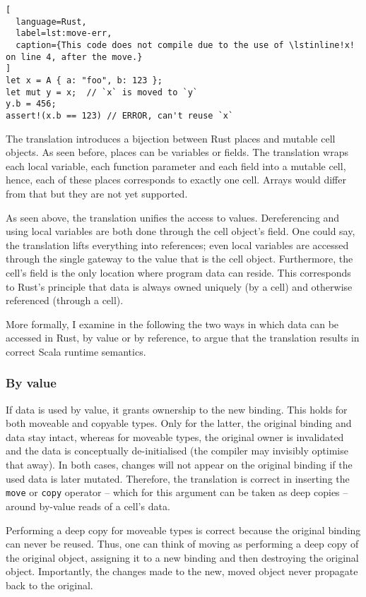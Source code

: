 \begin{lstlisting}[
  language=Rust,
  label=lst:move-err,
  caption={This code does not compile due to the use of \lstinline!x! on line 4, after the move.}
]
let x = A { a: "foo", b: 123 };
let mut y = x;  // `x` is moved to `y`
y.b = 456;
assert!(x.b == 123) // ERROR, can't reuse `x`
\end{lstlisting}

The translation introduces a bijection between Rust places and mutable cell
objects. As seen before, places can be variables or fields. The translation
wraps each local variable, each function parameter and each field into a mutable
cell, hence, each of these places corresponds to exactly one cell. Arrays would
differ from that but they are not yet supported.

As seen above, the translation unifies the access to values. Dereferencing and
using local variables are both done through the cell object's field. One could
say, the translation lifts everything into references; even local variables are
accessed through the single gateway to the value that is the cell object.
Furthermore, the cell's field is the only location where program data can
reside. This corresponds to Rust's principle that data is always owned uniquely
(by a cell) and otherwise referenced (through a cell).

More formally, I examine in the following the two ways in which data can be
accessed in Rust, by value or by reference, to argue that the translation
results in correct Scala runtime semantics.

\subsubsection{By value}
\label{sec:correctness-by-value}

If data is used by value, it grants ownership to the new binding. This holds for
both moveable and copyable types. Only for the latter, the original binding and
data stay intact, whereas for moveable types, the original owner is invalidated
and the data is conceptually de-initialised (the compiler may invisibly optimise
that away). In both cases, changes will not appear on the original binding if
the used data is later mutated. Therefore, the translation is correct in
inserting the \lstinline!move! or \lstinline!copy! operator -- which for this
argument can be taken as deep copies -- around by-value reads of a cell's data.

Performing a deep copy for moveable types is correct because the original
binding can never be reused. Thus, one can think of moving as performing a deep
copy of the original object, assigning it to a new binding and then destroying
the original object. Importantly, the changes made to the new, moved object
never propagate back to the original.

